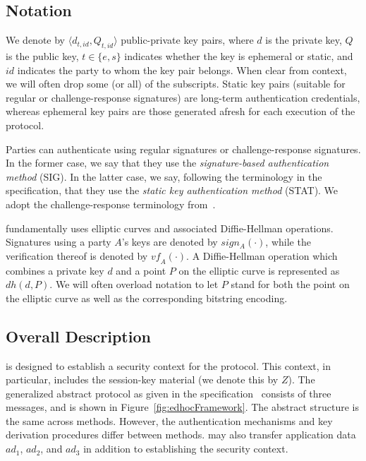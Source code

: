 \documentclass[runningheads]{llncs}
\newcommand{\mConstStyle}[1]{\textsf{#1}}
\newcommand{\mMethodStyle}[1]{\mConstStyle{#1}}
\newcommand{\mProtocolStyle}[1]{\text{#1}}
\newcommand{\mSpec}{specification}  %
\newcommand{\mEdhoc}{\mProtocolStyle{EDHOC}}
\newcommand{\mOscore}{\mProtocolStyle{OSCORE}}
\newcommand{\mStat}{\mMethodStyle{STAT}}
\newcommand{\mSig}{\mMethodStyle{SIG}}
\newcommand{\mSessKey}{\ensuremath{Z}}
\newcommand{\mSign}[1]{\ensuremath{\mathit{sign_{#1}}}}
\newcommand{\mVf}[1]{\ensuremath{\mathit{vf_{#1}}}}
\newcommand{\mDH}{\ensuremath{\mathit{dh}}}
\newcommand{\mADone}{\ensuremath{\mathit{ad}_1}}
\newcommand{\mADtwo}{\ensuremath{\mathit{ad}_2}}
\newcommand{\mADthree}{\ensuremath{\mathit{ad}_3}}
\begin{document}
\subsection{Notation}
\label{sec:notation}
We denote by $\langle d_{t, \mathit{id}}, Q_{t, \mathit{id}}\rangle$
public-private key pairs, where $d$ is the private key, $Q$ is the public key,
$t \in \{e, s\}$ indicates whether the key is ephemeral or static,
and $\mathit{id}$ indicates the party to whom the key pair belongs.
%
When clear from context, we will often drop some (or all) of the subscripts.
%
Static key pairs (suitable for regular or challenge-response signatures)
are long-term authentication credentials, whereas ephemeral key pairs are
those generated afresh for each execution of the protocol.
%

Parties can authenticate using regular signatures or challenge-response
signatures.
%
In the former case, we say that they use the
\emph{signature-based authentication method} (\mSig{}).
%
In the latter case, we say, following the terminology in the \mSpec{},
that they use the \emph{static key authentication method} (\mStat{}).
%
We adopt the challenge-response terminology
from~\cite{DBLP:conf/crypto/Krawczyk05}.
%

\mEdhoc{} fundamentally uses elliptic curves and associated Diffie-Hellman
operations.
%
Signatures using a party $A$'s keys are denoted by \mSign{A}$(\cdot)$, while
the verification thereof is denoted by \mVf{A}$(\cdot)$.
%
A Diffie-Hellman operation which combines a private key $d$ and a point $P$
on the elliptic curve is represented as $\mDH(d, P)$.
%
We will often overload notation to let $P$ stand for both the point on the
elliptic curve as well as the corresponding bitstring encoding.

\subsection{Overall Description}
\label{sec:description}
\mEdhoc{} is designed to establish a security context for the \mOscore{} protocol.
%
This context, in particular, includes the session-key material (we denote this by
\mSessKey{}).
%
The generalized abstract protocol as given in the \mSpec{}~\cite{our-analysis-selander-lake-edhoc-00} consists of three
messages, and is shown in Figure~\ref{fig:edhocFramework}.
%
The abstract structure is the same across methods.
%
However, the authentication mechanisms and key derivation procedures differ between
methods.
%
\mEdhoc{} may also transfer application data \mADone{}, \mADtwo{}, and \mADthree{} in
addition to establishing the \mOscore{} security context.
%
\end{document}
